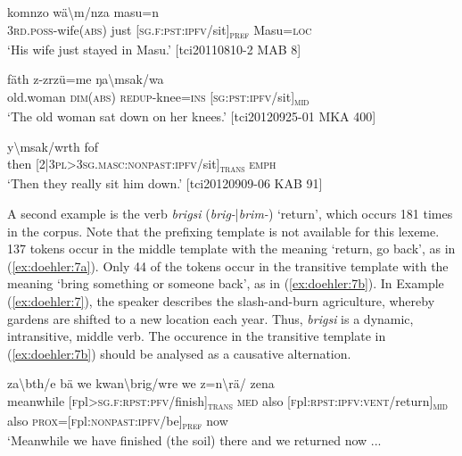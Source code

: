\documentclass[output=paper]{langscibook}
\begin{document}
\ea
	\label{ex:doehler:4}
	 {komnzo} {wä\textbackslash{m}/nza} {masu=n}\\
	\textsc{3rd}.\textsc{poss}-wife(\textsc{abs}) just [\textsc{sg}.\textsc{f}:\textsc{pst}:\textsc{ipfv}/sit]\textsubscript{\textsc{pref}} Masu=\textsc{loc}{}\\
	\glt `His wife just stayed in Masu.'
	[tci20110810-2 MAB 8]
\z



\ea
    \label{ex:doehler:5}
	 {fäth} {z-zrzü=me} {ŋa\textbackslash{msak}/wa}\\
	old.woman \textsc{dim}(\textsc{abs}) \textsc{redup}-knee=\textsc{ins}{} [\textsc{sg}:\textsc{pst}:\textsc{ipfv}/sit]\textsubscript{\textsc{mid}}\\
	\glt `The old woman sat down on her knees.'	[tci20120925-01 MKA 400]
\z


\ea
    \label{ex:doehler:6}
	 {y\textbackslash{msak}/wrth} {fof}\\
	then [2|3\textsc{pl}>3\textsc{sg}.\textsc{masc}:\textsc{nonpast}:\textsc{ipfv}/sit]\textsubscript{\textsc{trans}} \textsc{emph}\\
	\glt `Then they really sit him down.'
	[tci20120909-06 KAB 91]%
\z

A second example is the verb \emph{brigsi} (\emph{brig-}|\emph{brim-}) `return', which occurs 181 times in the corpus. Note that the prefixing template is not available for this lexeme. 137 tokens occur in the middle template with the meaning `return, go back', as in (\ref{ex:doehler:7a}). Only 44 of the tokens occur in the transitive template with the meaning `bring something or someone back', as in (\ref{ex:doehler:7b}). In Example (\ref{ex:doehler:7}), the speaker describes the slash-and-burn agriculture, whereby gardens are shifted to a new location each year. Thus, \emph{brigsi} is a dynamic, intransitive, middle verb. The occurence in the transitive template in (\ref{ex:doehler:7b}) should be analysed as a causative alternation.

\ea
	\label{ex:doehler:7}
	\ea
		 {za\textbackslash{bth}/e} {bä} {we} {kwan\textbackslash{brig}/wre} {we} {z=n\textbackslash{rä}/} {zena}\\
			meanwhile [\textsc{f}pl>\textsc{sg}.\textsc{f}:\textsc{rpst}:\textsc{pfv}/finish]\textsubscript{\textsc{trans}} \textsc{med}{} also [\textsc{f}pl:\textsc{rpst}:\textsc{ipfv}:\textsc{vent}/return]\textsubscript{\textsc{mid}} also \textsc{prox}=[\textsc{f}pl:\textsc{nonpast}:\textsc{ipfv}/be]\textsubscript{\textsc{pref}} now\\
			\glt `Meanwhile we have finished (the soil) there and we returned now ...
			\label{ex:doehler:7a}
	
\end{document}

